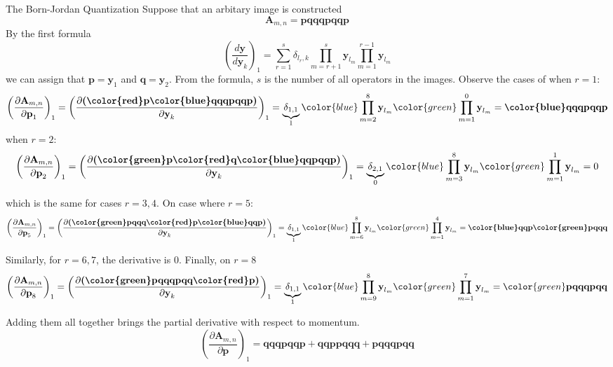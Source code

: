 \documentclass[aspectratio=169]{beamer}
\begin{document}
	\begin{frame}[allowframebreaks]{The Born-Jordan Quantization}
		Suppose that an arbitary image is constructed
		\begin{equation}
			\textbf{A}_{m,n}=\textbf{pqqqpqqp}
		\end{equation}
		By the first formula
		\begin{equation}
			\left(\frac{d\textbf{y}}{d\textbf{y}_k}\right)_1=\sum_{r=1}^{s}\delta_{l_r,k}\prod_{m=r+1}^{s}\textbf{y}_{l_m}\prod_{m=1}^{r-1}\textbf{y}_{l_m}
		\end{equation}
		we can assign that $\textbf{p}=\textbf{y}_1$ and $\textbf{q}=\textbf{y}_2$. From the formula, $s$ is the number of all operators in the images. Observe the cases of when $r=1$:
		\begin{equation}
			\left(\frac{\partial\textbf{A}_{m,n}}{\partial\textbf{p}_1}\right)_1=\left(\frac{\partial\textbf{({\color{red}p}{\color{blue}qqqpqqp})}}{\partial\textbf{y}_k}\right)_1=\underbrace{\delta_{1,1}}_1{\color{blue}\prod_{m=2}^8\textbf{y}_{l_m}}{\color{green}\prod_{m=1}^{0}\textbf{y}_{l_m}}=\textbf{\color{blue}qqqpqqp}
		\end{equation}
		when $r=2$:
		\begin{equation}
			\left(\frac{\partial\textbf{A}_{m,n}}{\partial\textbf{p}_2}\right)_1=\left(\frac{\partial\textbf{({\color{green}p}{\color{red}q}{\color{blue}qqpqqp})}}{\partial\textbf{y}_k}\right)_1=\underbrace{\delta_{2,1}}_0{\color{blue}\prod_{m=3}^8\textbf{y}_{l_m}}{\color{green}\prod_{m=1}^{1}\textbf{y}_{l_m}}=0
		\end{equation}
		
		\framebreak
		which is the same for cases $r=3,4$. On case where $r=5$:
		\begin{equation}
			\left(\frac{\partial\textbf{A}_{m,n}}{\partial\textbf{p}_5}\right)_1=\left(\frac{\partial\textbf{({\color{green}pqqq}{\color{red}p}{\color{blue}qqp})}}{\partial\textbf{y}_k}\right)_1=\underbrace{\delta_{1,1}}_1{\color{blue}\prod_{m=6}^8\textbf{y}_{l_m}}{\color{green}\prod_{m=1}^{4}\textbf{y}_{l_m}}=\textbf{{\color{blue}qqp}{\color{green}pqqq}}
		\end{equation}
		
		Similarly, for $r=6,7$, the derivative is 0. Finally, on $r=8$
		\begin{equation}
			\left(\frac{\partial\textbf{A}_{m,n}}{\partial\textbf{p}_8}\right)_1=\left(\frac{\partial\textbf{({\color{green}pqqqpqq}{\color{red}p})}}{\partial\textbf{y}_k}\right)_1=\underbrace{\delta_{1,1}}_1{\color{blue}\prod_{m=9}^8\textbf{y}_{l_m}}{\color{green}\prod_{m=1}^{7}\textbf{y}_{l_m}}={\color{green}\textbf{pqqqpqq}}
		\end{equation}
		
		Adding them all together brings the partial derivative with respect to momentum.
		\begin{equation}
			\left(\frac{\partial\textbf{A}_{m,n}}{\partial\textbf{p}}\right)_1=\textbf{qqqpqqp}+\textbf{qqppqqq}+\textbf{pqqqpqq}
		\end{equation}
	\end{frame}
	
\end{document}
